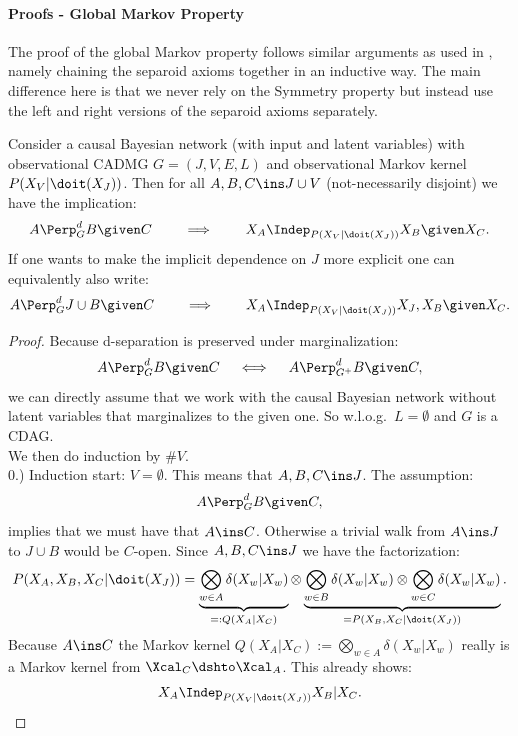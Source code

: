 \paragraph{Proofs - Global Markov Property }\hfill

The proof of the global Markov property follows similar arguments as used in \cite{Lau90, Ver93, Ric03, FM17, FM18, RERS17}, 
namely chaining the separoid axioms together in an inductive way.
The main difference here is that we never rely on the Symmetry property but instead use 
the left and right versions of the separoid axioms separately.


\begin{Thm}
\label{GMP-CCBN}
Consider a causal Bayesian network (with input and latent variables) with observational CADMG $G=(J,V,E,L)$ 
and observational Markov kernel $P(X_V|\doit(X_J))$.
Then for all $A, B, C \ins J \cup V$ (not-necessarily disjoint) we have the implication:
\[ A \Perp^d_G B \given C \qquad \implies \qquad X_A \Indep_{P(X_V|\doit(X_J))} X_B \given X_C.   \]
If one wants to make the implicit dependence on $J$ more explicit one can equivalently also write:
\[ A \Perp^d_G J \cup B \given C \qquad \implies \qquad X_A \Indep_{P(X_V|\doit(X_J))} X_J,X_{B} \given X_C.   \]
\begin{proof}
Because d-separation is preserved under marginalization:
\[ A \Perp^d_G B \given C \quad \iff \quad A \Perp^d_{G^+} B \given C,   \]
we can directly assume that we work with the causal Bayesian network without latent variables that marginalizes to the given one.
So w.l.o.g.\ $L=\emptyset$ and $G$ is a CDAG.\\
We then do induction by $\#V$. \\


0.) Induction start:  $V= \emptyset$. This means that $A,B,C \ins J$.
The assumption: 
\[A \Perp^d_G  B \given C,\] 
implies that we must have that $A \ins C$. Otherwise a trivial walk from $A \ins J$ to $J \cup B$ would be $C$-open.
Since $A,B,C \ins J$ we have the factorization:
\[ P(X_A,X_B,X_C|\doit(X_J)) = \underbrace{\bigotimes_{w \in A} \delta(X_w|X_w)}_{=:Q(X_A|X_C)} \otimes 
 \underbrace{\bigotimes_{w \in B} \delta(X_w|X_w) \otimes \bigotimes_{w \in C} \delta(X_w|X_w)}_{=P(X_B,X_C|\doit(X_J))}.  \]
 Because $A \ins C$ the Markov kernel $Q(X_A|X_C):= \bigotimes_{w \in A} \delta(X_w|X_w) $ 
 really is a Markov kernel from $\Xcal_C \dshto \Xcal_A$.
This already shows:
\[ X_A \Indep_{P(X_V|\doit(X_J))} X_B |X_C.\]


\end{proof}
\end{Thm}
